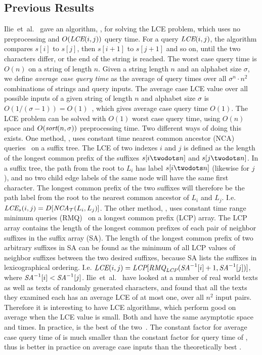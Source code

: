 \documentclass[a4]{article}
\begin{document}
\subsection{Previous Results\label{sec:existing-results}}

Ilie~et~al.~\cite{ilie-navarro-tinta} gave an algorithm, , for solving the LCE problem, which uses no preprocessing and $O(\textit{LCE}(i,j))$ query time. For a query $\textit{LCE}(i,j)$, the algorithm compares $s[i]$ to $s[j]$, then $s[i+1]$ to $s[j+1]$ and so on, until the two characters differ, or the end of the string is reached. The worst case query time is $O(n)$ on a string of length $n$.
Given a string length $n$ and an alphabet size $\sigma$, we define \emph{average case query time} as the average of query times over all $\sigma^n\cdot n^2$ combinations of strings and query inputs.
The average case LCE value over all possible inputs of a given string of length $n$ and alphabet size $\sigma$ is $O(1/(\sigma-1))=O(1)$~\cite{ilie-navarro-tinta}, which gives  average case query time $O(1)$.
The LCE problem can be solved with $O(1)$ worst case query time, using $O(n)$ space and $O(\textit{sort}(n,\sigma))$ preprocessing time. Two different ways of doing this exists.
One method, , uses constant time nearest common ancestor (NCA) queries~\cite{nca} on a suffix tree. The LCE of two indexes $i$ and $j$ is defined as the length of the longest common prefix of the suffixes $s[i\twodots n]$ and $s[j\twodots n]$. In a suffix tree, the path from the root to $L_i$ has label $s[i\twodots n]$ (likewise for $j$), and no two child edge labels of the same node will have the same first character. The longest common prefix of the two suffixes will therefore be the path label from the root to the nearest common ancestor of $L_i$ and $L_j$. I.e. $\textit{LCE}_s(i,j) = D[\textit{NCA}_\mathcal{T}(L_i,L_j)]$.
The other method, , uses constant time range minimum queries (RMQ)~\cite{jf-rmq} on a longest common prefix (LCP) array. The LCP array contains the length of the longest common prefixes of each pair of neighbor suffixes in the suffix array (SA). The length of the longest common prefix of two arbitrary suffixes in SA can be found as the minimum of all LCP values of neighbor suffixes between the two desired suffixes, because SA lists the suffixes in lexicographical ordering. I.e. $\textit{LCE}(i,j)=\textit{LCP}[\textit{RMQ}_{\textit{LCP}}(\textit{SA}^{-1}[i] + 1, \textit{SA}^{-1}[j])]$, where $\textit{SA}^{-1}[i] < \textit{SA}^{-1}[j]$.
Ilie~et~al.~\cite{ilie-navarro-tinta} have looked at a number of real world texts as well as texts of randomly generated characters, and found that all the texts they examined each has an average LCE of at most one, over all $n^2$ input pairs. Therefore it is interesting to have LCE algorithms, which perform good on average when the LCE value is small.
Both  and  have the same asymptotic space and times. In practice,  is the best of the two~\cite{ilie-navarro-tinta}. The constant factor for average case query time of  is much smaller than the constant factor for query time of , thus  is better in practice on average case inputs than the theoretically best .
\end{document}
